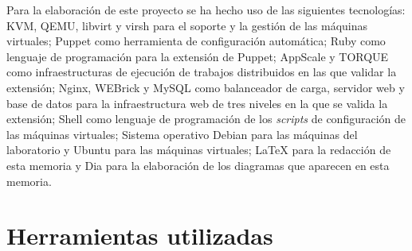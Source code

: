 
Para la elaboración de este proyecto se ha hecho uso de las siguientes tecnologías: KVM, QEMU, libvirt y virsh para el soporte y la gestión de las máquinas virtuales; Puppet como herramienta de configuración automática; Ruby como lenguaje de programación para la extensión de Puppet; AppScale y TORQUE como infraestructuras de ejecución de trabajos distribuidos en las que validar la extensión; Nginx, WEBrick y MySQL como balanceador de carga, servidor web y base de datos para la infraestructura web de tres niveles en la que se valida la extensión; Shell como lenguaje de programación de los \emph{scripts} de configuración de las máquinas virtuales; Sistema operativo Debian para las máquinas del laboratorio y Ubuntu para las máquinas virtuales; \LaTeX{} \cite{manual:latex} para la redacción de esta memoria y Dia para la elaboración de los diagramas que aparecen en esta memoria.


\section{Herramientas utilizadas}

